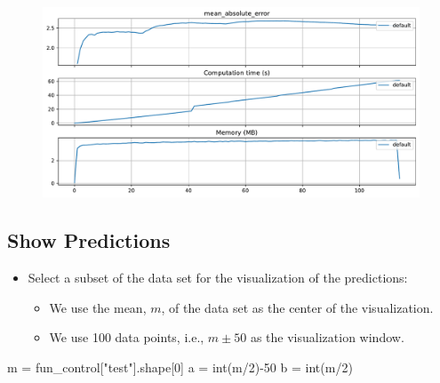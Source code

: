 \documentclass[
  letterpaper,
  DIV=11,
  numbers=noendperiod]{scrreprt}
\newenvironment{Shaded}{\begin{snugshade}}{\end{snugshade}}
\newcommand{\BuiltInTok}[1]{\textcolor[rgb]{0.00,0.23,0.31}{#1}}
\newcommand{\DecValTok}[1]{\textcolor[rgb]{0.68,0.00,0.00}{#1}}
\newcommand{\NormalTok}[1]{\textcolor[rgb]{0.00,0.23,0.31}{#1}}
\newcommand{\OperatorTok}[1]{\textcolor[rgb]{0.37,0.37,0.37}{#1}}
\newcommand{\StringTok}[1]{\textcolor[rgb]{0.13,0.47,0.30}{#1}}
\providecommand{\tightlist}{%
  \setlength{\itemsep}{0pt}\setlength{\parskip}{0pt}}\usepackage{longtable,booktabs,array}
\begin{document}
\begin{figure}[H]

{\centering \includegraphics{025_spot_hpt_river_friedman_amfr_files/figure-pdf/cell-29-output-1.pdf}

}

\end{figure}

\hypertarget{show-predictions-1}{%
\subsection{Show Predictions}\label{show-predictions-1}}

\begin{itemize}
\tightlist
\item
  Select a subset of the data set for the visualization of the
  predictions:

  \begin{itemize}
  \tightlist
  \item
    We use the mean, \(m\), of the data set as the center of the
    visualization.
  \item
    We use 100 data points, i.e., \(m \pm 50\) as the visualization
    window.
  \end{itemize}
\end{itemize}

\begin{Shaded}
\begin{Highlighting}[]
\NormalTok{m }\OperatorTok{=}\NormalTok{ fun\_control[}\StringTok{"test"}\NormalTok{].shape[}\DecValTok{0}\NormalTok{]}
\NormalTok{a }\OperatorTok{=} \BuiltInTok{int}\NormalTok{(m}\OperatorTok{/}\DecValTok{2}\NormalTok{)}\OperatorTok{{-}}\DecValTok{50}
\NormalTok{b }\OperatorTok{=} \BuiltInTok{int}\NormalTok{(m}\OperatorTok{/}\DecValTok{2}\NormalTok{)}
\end{Highlighting}
\end{Shaded}
\end{document}
